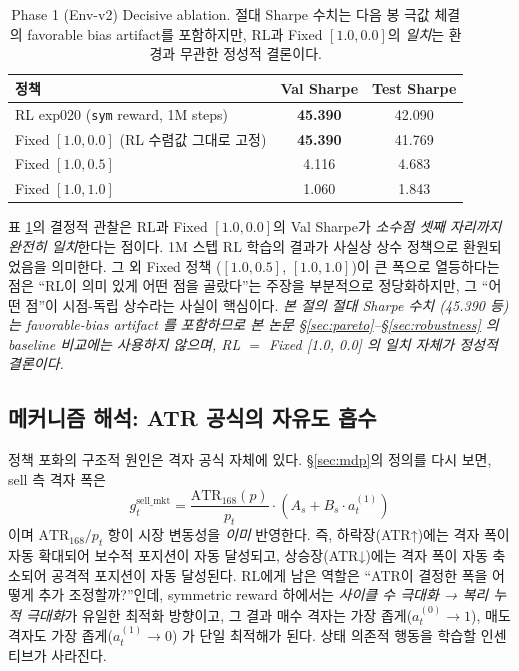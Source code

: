 \documentclass[11pt, a4paper]{article}
\begin{document}
\begin{table}[!htbp]
\centering
\caption{Phase 1 (Env-v2) Decisive ablation. 절대 Sharpe 수치는 다음 봉 극값
체결의 favorable bias artifact를 포함하지만, RL과 Fixed $[1.0, 0.0]$의
\emph{일치}는 환경과 무관한 정성적 결론이다.}
\begin{tabular}{lcc}
\toprule
정책 & Val Sharpe & Test Sharpe \\
\midrule
RL exp020 (\texttt{sym} reward, 1M steps) & \textbf{45.390} & 42.090 \\
Fixed $[1.0, 0.0]$ (RL 수렴값 그대로 고정) & \textbf{45.390} & 41.769 \\
\midrule
Fixed $[1.0, 0.5]$ & 4.116 & 4.683 \\
Fixed $[1.0, 1.0]$ & 1.060 & 1.843 \\
\bottomrule
\end{tabular}
\label{tab:phase1_ablation}
\end{table}

표 \ref{tab:phase1_ablation}의 결정적 관찰은 RL과 Fixed $[1.0, 0.0]$의 Val Sharpe가
\emph{소수점 셋째 자리까지 완전히 일치}한다는 점이다. 1M 스텝 RL 학습의 결과가
사실상 상수 정책으로 환원되었음을 의미한다. 그 외 Fixed 정책 ($[1.0, 0.5]$,
$[1.0, 1.0]$)이 큰 폭으로 열등하다는 점은 ``RL이 의미 있게 어떤 점을 골랐다''는
주장을 부분적으로 정당화하지만, 그 ``어떤 점''이 시점-독립 상수라는 사실이 핵심이다.
\emph{본 절의 절대 Sharpe 수치 (45.390 등) 는 favorable-bias artifact 를 포함하므로
본 논문 §\ref{sec:pareto}--§\ref{sec:robustness} 의 baseline 비교에는 사용하지
않으며, RL $=$ Fixed [1.0, 0.0] 의 일치 자체가 정성적 결론이다.}

\subsection{메커니즘 해석: ATR 공식의 자유도 흡수}
\label{sec:phase1_mechanism}

정책 포화의 구조적 원인은 격자 공식 자체에 있다. \S\ref{sec:mdp}의 정의를 다시
보면, sell 측 격자 폭은
\begin{equation}
g^{\mathrm{sell\_mkt}}_t = \frac{\mathrm{ATR}_{168}(p)}{p_t}
\cdot (A_s + B_s \cdot a_t^{(1)})
\end{equation}
이며 $\mathrm{ATR}_{168}/p_t$ 항이 시장 변동성을 \emph{이미} 반영한다. 즉,
하락장(ATR↑)에는 격자 폭이 자동 확대되어 보수적 포지션이 자동 달성되고,
상승장(ATR↓)에는 격자 폭이 자동 축소되어 공격적 포지션이 자동 달성된다.
RL에게 남은 역할은 ``ATR이 결정한 폭을 어떻게 추가 조정할까?''인데, symmetric
reward 하에서는 \emph{사이클 수 극대화 → 복리 누적 극대화}가 유일한 최적화
방향이고, 그 결과 매수 격자는 가장 좁게($a_t^{(0)} \to 1$), 매도 격자도 가장
좁게($a_t^{(1)} \to 0$) 가 단일 최적해가 된다. 상태 의존적 행동을 학습할
인센티브가 사라진다.
\end{document}
